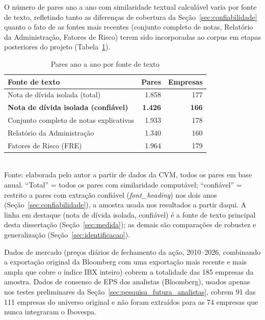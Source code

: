 \documentclass[a4paper,12pt]{report}
\begin{document}
O número de pares ano a ano com similaridade textual calculável varia por fonte de texto, refletindo tanto as diferenças de cobertura da Seção~\ref{sec:confiabilidade} quanto o fato de as fontes mais recentes (conjunto completo de notas, Relatório da Administração, Fatores de Risco) terem sido incorporadas ao corpus em etapas posteriores do projeto (Tabela~\ref{tab:sample}).

\begin{table}[htbp]
    \centering
    \caption{Pares ano a ano por fonte de texto}
    \label{tab:sample}
    \begin{tabular}{@{}lrr@{}}
        \toprule
        \textbf{Fonte de texto} & \textbf{Pares} & \textbf{Empresas} \\
        \midrule
        Nota de dívida isolada (total)      & 1.858 & 177 \\
        \rowcolor{fontechave}
        \textbf{Nota de dívida isolada (confiável)}  & \textbf{1.426} & \textbf{166} \\
        Conjunto completo de notas explicativas & 1.933 & 178 \\
        Relatório da Administração & 1.340 & 160 \\
        Fatores de Risco (FRE) & 1.964 & 179 \\
        \bottomrule
    \end{tabular}
    \\[0.3cm]
    {\footnotesize Fonte: elaborada pelo autor a partir de dados da CVM, todos os pares em base anual. ``Total'' = todos os pares com similaridade computável; ``confiável'' = restrito a pares com extração confiável (\textit{font\_heading}) nos dois anos (Seção~\ref{sec:confiabilidade}), a amostra usada nos resultados a partir daqui. A linha em destaque (nota de dívida isolada, confiável) é a fonte de texto principal desta dissertação (Seção~\ref{sec:medida}); as demais são comparações de robustez e generalização (Seção~\ref{sec:identificacao}).}
\end{table}

Dados de mercado (preços diários de fechamento da ação, 2010--2026, combinando a exportação original da Bloomberg com uma exportação mais recente e mais ampla que cobre o índice IBX inteiro) cobrem a totalidade das 185 empresas da amostra. Dados de consenso de EPS dos analistas (Bloomberg), usados apenas nos testes preliminares da Seção~\ref{sec:pesquisa_futura_analistas}, cobrem 91 das 111 empresas do universo original e não foram extraídos para as 74 empresas que nunca integraram o Ibovespa.
\end{document}
